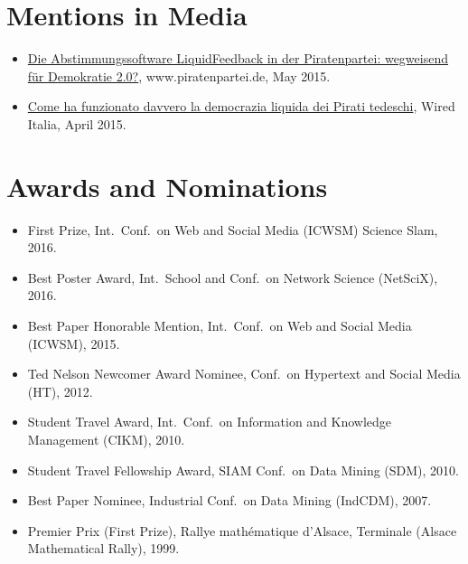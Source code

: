 \documentclass[line,margin]{res}
\begin{document}
\begin{resume}
\section{Mentions in Media}
\begin{itemize}
  \item
    \href{https://www.piratenpartei.de/2015/05/31/die-abstimmungssoftware-liquidfeedback-der-piratenpartei-wegweisend-fuer-demokratie-2-0/}{Die
      Abstimmungssoftware LiquidFeedback in der Piratenpartei:
      wegweisend für Demokratie 2.0?}, www.piratenpartei.de, May 2015. 
\item
  \href{http://www.wired.it/attualita/2015/04/01/come-funzionato-davvero-democrazia-liquida-dei-pirati-tedeschi/}{Come
    ha funzionato davvero la democrazia liquida dei Pirati tedeschi},
  Wired Italia, April 2015. 
\end{itemize}

\section{Awards and Nominations}
\begin{itemize}
  \item First Prize, Int.\ Conf.\ on Web and Social Media (ICWSM) Science Slam, 2016.
  \item Best Poster Award, Int.\ School and Conf.\ on Network Science
    (NetSciX), 2016. 
  \item Best Paper Honorable Mention, Int.\ Conf.\ on Web and Social
    Media (ICWSM), 2015.  
  \item Ted Nelson Newcomer Award Nominee, Conf.\ on Hypertext and
    Social Media (HT), 2012.   
  \item Student Travel Award, Int.\ Conf.\ on Information and Knowledge
    Management (CIKM), 2010. 
  \item Student Travel Fellowship Award, SIAM Conf.\ on Data Mining (SDM),
    2010.  
  \item Best Paper Nominee, Industrial Conf.\ on Data Mining (IndCDM), 2007.    
  \item Premier Prix (First Prize), Rallye mathématique d'Alsace, Terminale (Alsace Mathematical Rally), 1999. 
\end{itemize}


\end{resume}
\end{document}
